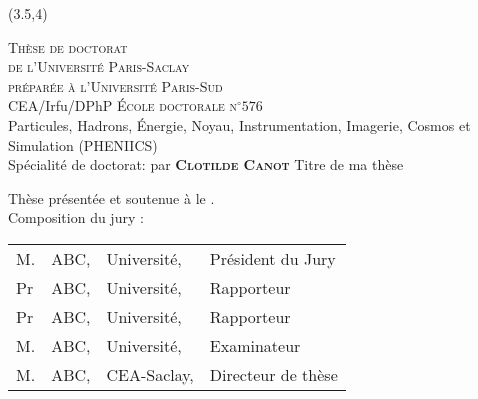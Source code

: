 \begin{textblock}{12.8}(3.5,4)

\color{blue!20!red!45!black} %
\begin{center}
    \LARGE\textsc{Thèse de doctorat\\ de l'Université Paris-Saclay} \\
    \LARGE{\textsc{préparée à l'Université Paris-Sud}} \\ \bigskip
  	\color{black} %
	\vfill \vfill
	\Large{CEA/Irfu/DPhP}
	\vfill \vfill
    \Large\textsc{École doctorale n$^{\circ}576$}\\ %
    \Large{Particules, Hadrons, Énergie, Noyau, Instrumentation, Imagerie, Cosmos et Simulation (PHENIICS)} \\
	\Large{Spécialité de doctorat:  } %
    \vfill  
   	\Large{par}
   	\vfill
   	\LARGE{\textbf{\textsc{Clotilde Canot}}} %
    \vfill
    \Large{Titre de ma thèse} %
    \vfill
\end{center}

\small{
\color{black}
\begin{flushleft}
Thèse présentée et soutenue à  le . \\
\bigskip
Composition du jury :
\end{flushleft}

\begin{center}
  \begin{tabular}{llll}

	
	
	M.		& ABC,			& Université,		& Président du Jury	\\
	Pr		& ABC,			& Université,		& Rapporteur			\\	
	Pr		& ABC,			& Université,		& Rapporteur			\\
	M.		& ABC,			& Université,		& Examinateur		\\
	M.		& ABC,			& CEA-Saclay,		& Directeur de thèse	\\  
   
  \end{tabular}    
\end{center}
}




\end{textblock}






















